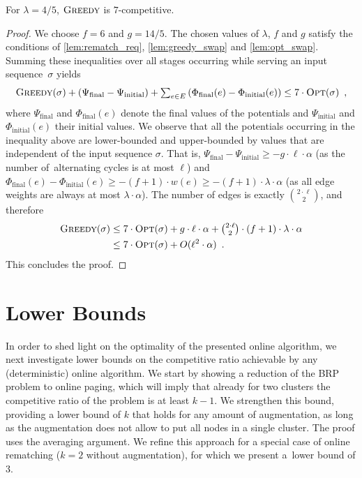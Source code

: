 \begin{theorem}
\label{thm:rematching}
For $\lambda = 4/5$, $\textsc{Greedy}$ is $7$-competitive.
\end{theorem}

\begin{proof}
We choose $f = 6$ and $g = 14/5$. The chosen values of $\lambda$, $f$ and $g$
satisfy the conditions of \ref{lem:rematch_req},
\ref{lem:greedy_swap} and \ref{lem:opt_swap}. Summing these
inequalities over all stages occurring while serving an input sequence~$\sigma$
yields
\begin{equation*}
	\textstyle \textsc{Greedy}(\sigma) + (\Psi_\textrm{final} - \Psi_\textrm{initial})
	+ \sum_{e \in E} \left( 
		\Phi_\textrm{final}(e) - \Phi_\textrm{initial}(e) \right)
	\leq 7 \cdot \textsc{Opt}(\sigma) \enspace,
\end{equation*}
where $\Psi_\textrm{final}$ and $\Phi_\textrm{final}(e)$ denote the final
values of the potentials and $\Psi_\textrm{initial}$ and
$\Phi_\textrm{initial}(e)$ their initial values. We observe that all the
potentials occurring in the inequality above are lower-bounded and
upper-bounded by values that are independent of the input sequence $\sigma$.
That is, $\Psi_\textrm{final} - \Psi_\textrm{initial} \geq - g \cdot \ell
\cdot \alpha$ (as the number of~alternating cycles is at most $\ell$) and
$\Phi_\textrm{final}(e) - \Phi_\textrm{initial}(e) \geq - (f+1) \cdot w(e)
\geq - (f+1) \cdot \lambda \cdot \alpha$ (as all edge weights are always 
at most $\lambda \cdot \alpha$). The number of edges is exactly $\binom{2
\cdot \ell}{2}$, and therefore
\begin{align*}
	 \textsc{Greedy}(\sigma) 
	\leq &\; 7 \cdot \textsc{Opt}(\sigma) 
	+ \textstyle g \cdot \ell \cdot \alpha + \binom{2 \cdot \ell}{2} \cdot (f+1) \cdot 
	\lambda \cdot \alpha \\
	\leq &\; 7 \cdot \textsc{Opt}(\sigma) 
	+ O(\ell^2 \cdot \alpha)
	\enspace.
\end{align*}
This concludes the proof.
\end{proof}



\section{Lower Bounds}
\label{sec:lower}

In order to shed light on the optimality of the presented online algorithm, we
next investigate lower bounds on the competitive ratio achievable by any
(deterministic) online algorithm. We start by showing a reduction of the BRP
problem to online paging, which will imply that already for two clusters the
competitive ratio of the problem is at least $k-1$. We strengthen this bound,
providing a lower bound of $k$ that holds for any amount of augmentation, as
long as the augmentation does not allow to put all nodes in a single 
cluster. The proof uses the averaging argument. We refine this approach for a
special case of online rematching ($k = 2$ without augmentation), for which we
present a~lower bound of $3$.


